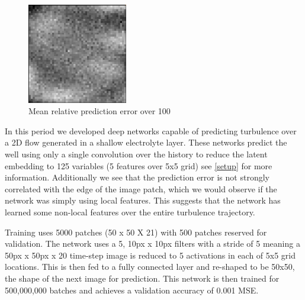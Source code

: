 \documentclass[10pt,letterpaper]{report}
\begin{document}
\begin{figure}
	\begin{center}
		\includegraphics[width=0.39\textwidth]{images/mean_error_turbulence.png}
		\caption{\small Mean relative prediction error over 100  }
		\label{mean_error}
	\end{center}	
\end{figure}



In this period we developed deep networks capable of predicting turbulence over a 2D  flow generated in a shallow electrolyte layer. These networks predict the  well using only a single convolution over the history to reduce the latent embedding to 125 variables (5 features over 5x5 grid) see \ref{setup} for more information. Additionally we see that the prediction error is not strongly correlated with the edge of the image patch, which we would observe if the network was simply using local features. This suggests that the network has learned some non-local features over the entire turbulence trajectory.

Training uses 5000 patches (50 x 50 X 21) with 500 patches reserved for validation. The network uses a 5, 10px x 10px filters with a stride of 5 meaning a 50px x 50px x 20 time-step image is reduced to 5 activations in each of 5x5 grid locations. This is then fed to a fully connected layer and re-shaped to be 50x50, the shape of the next image for prediction. This network is then trained for 500,000,000 batches and achieves a validation accuracy of 0.001 MSE.
\end{document}
